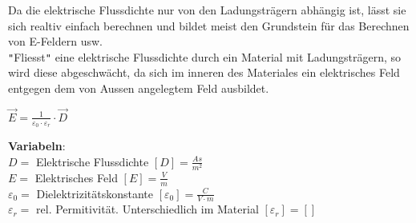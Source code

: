 \newpage

Da die elektrische Flussdichte nur von den Ladungsträgern abhängig ist, lässt sie sich realtiv einfach berechnen und bildet meist den Grundstein für
das Berechnen von E-Feldern usw. \\
\texttt{"}Fliesst\texttt{"} eine elektrische Flussdichte durch ein Material mit Ladungsträgern, so wird diese abgeschwächt, da sich im inneren des Materiales ein
elektrisches Feld entgegen dem von Aussen angelegtem Feld ausbildet. \\
\begin{center}
\end{center}

\begingl
\begin{center}
	\formulaBegin
	$ \vec{E} = \frac{1}{\varepsilon_0 \cdot \varepsilon_r} \cdot \vec{D}$
	\formulaEnd
\end{center}
\textbf{Variabeln}: \\
$D = $ Elektrische Flussdichte $ [D] = \frac{As}{m^2}$ \\
$ E = $ Elektrisches Feld $[E] = \frac{V}{m}$ \\
$ \varepsilon_0 = $ Dielektrizitätskonstante $ [\varepsilon_0] = \frac{C}{V\cdot m}$ \\
$ \varepsilon_r = $ rel. Permitivität. Unterschiedlich im Material $ [\varepsilon_r] = [ ]$ \\

\iend


\newpage


